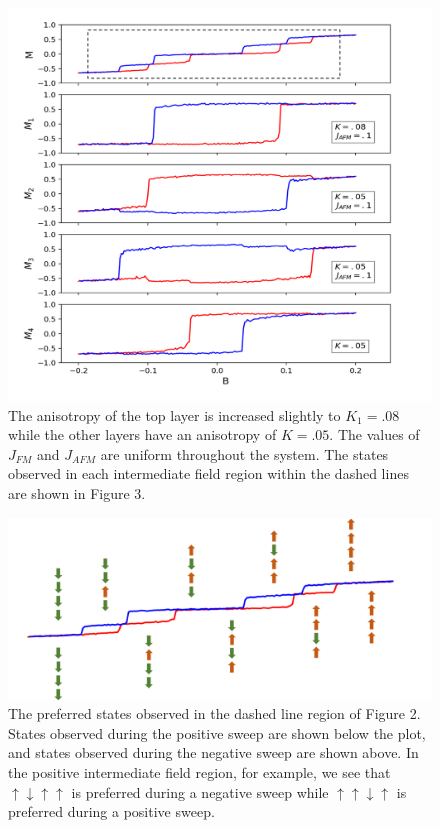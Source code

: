 \documentclass[10pt]{article}
\begin{document}
\begin{figure}[!htb]
\includegraphics[width=\textwidth]{bistable_new_2.png}
\caption{The anisotropy of the top layer is increased slightly to $K_{1} = .08$ while the other layers have an anisotropy of $K = .05$. The values of
$J_{FM}$ and $J_{AFM}$ are uniform throughout the system. The states observed in each intermediate field region within the dashed lines are shown in Figure 3. }
\end{figure}
\begin{figure}[!htb]
\includegraphics[width=\textwidth]{bistable_new_inset.png}
\caption{The preferred states observed in the dashed line region of Figure 2. States observed during the positive sweep are shown below the plot, and states observed during the negative sweep are shown above.
In the positive intermediate field region, for example, we see that $\uparrow \downarrow \uparrow  \uparrow$ is preferred during a negative sweep while
$\uparrow \uparrow \downarrow  \uparrow$  is preferred during a positive sweep. }
\end{figure}
\end{document}
